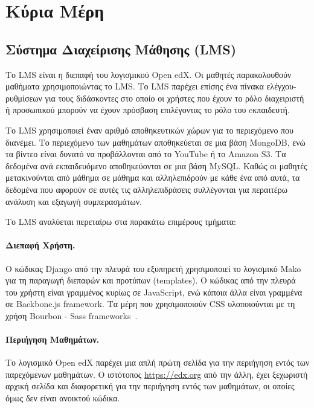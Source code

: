 \documentclass[12pt]{report}
\begin{document}
\section{Κύρια Μέρη}
\subsection{Σύστημα Διαχείρισης Μάθησης (\textlatin{LMS})}\label{lms}
Το \textlatin{LMS} είναι η διεπαφή του λογισμικού \textlatin{Open edX}. Οι μαθητές παρακολουθούν μαθήματα χρησιμοποιώντας το \textlatin{LMS}. Το \textlatin{LMS} παρέχει επίσης ένα πίνακα ελέγχου-ρυθμίσεων για τους διδάσκοντες στο οποίο οι χρήστες που έχουν το ρόλο διαχειριστή ή προσωπικού μπορούν να έχουν πρόσβαση επιλέγοντας το ρόλο του eκπαιδευτή.

Το \textlatin{LMS} χρησιμοποιεί έναν αριθμό αποθηκευτικών χώρων για το περιεχόμενο που διανέμει. Το περιεχόμενο των μαθημάτων αποθηκεύεται σε μια βάση \textlatin{MongoDB}, ενώ τα βίντεο είναι δυνατό να προβάλλονται από το \textlatin{YouTube} ή το \textlatin{Amazon S3}. Τα δεδομένα ανά εκπαιδευόμενο αποθηκεύονται σε μια βάση \textlatin{MySQL}. Καθώς οι μαθητές μετακινούνται από μάθημα σε μάθημα και αλληλεπιδρούν με κάθε ένα από αυτά, τα δεδομένα που αφορούν σε αυτές τις αλληλεπιδράσεις συλλέγονται για περαιτέρω ανάλυση και εξαγωγή συμπερασμάτων.

Το \textlatin{LMS} αναλύεται περεταίρω στα παρακάτω επιμέρους τμήματα:
 \paragraph{Διεπαφή Χρήστη.} Ο κώδικας \textlatin{Django} από την πλευρά του εξυπηρετή χρησιμοποιεί το λογισμικό \textlatin{Mako} για τη παραγωγή διεπαφών και προτύπων (\textlatin{templates}). Ο κώδικας από την πλευρά του χρήστη είναι γραμμένος κυρίως σε \textlatin{JavaScript}, ενώ κάποια άλλα είναι γραμμένα σε \textlatin{Backbone.js framework}. Τα μέρη που χρησιμοποιούν \textlatin{CSS} υλοποιούνται με τη χρήση \textlatin{Bourbon - Sass frameworks}~\cite{edx_arch}.
 \paragraph{Περιήγηση Mαθημάτων.} Το λογισμικό \textlatin{Open edX} παρέχει μια απλή πρώτη σελίδα για την περιήγηση εντός των παρεχόμενων μαθημάτων. Ο ιστότοπος \textlatin{\url{https://edx.org}} από την άλλη, έχει ξεχωριστή αρχική σελίδα και διαφορετική για την περιήγηση εντός των μαθημάτων, οι οποίες όμως δεν είναι ανοικτού κώδικα.
\end{document}
